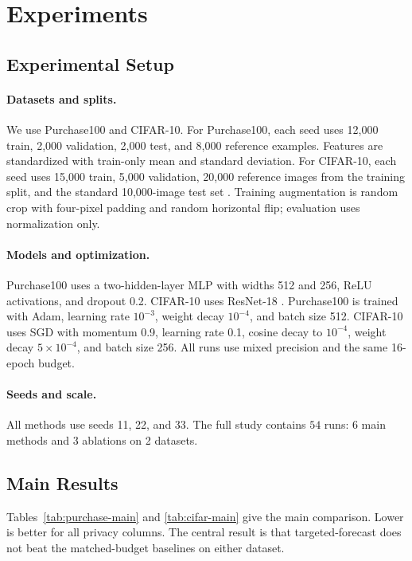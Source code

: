 \documentclass{article}
\newcommand{\purch}{Purchase100}
\newcommand{\cifar}{CIFAR-10}
\begin{document}
\section{Experiments}
\label{sec:experiments}

\subsection{Experimental Setup}

\paragraph{Datasets and splits.}
We use \purch{} and \cifar{}.
For \purch{}, each seed uses 12{,}000 train, 2{,}000 validation, 2{,}000 test, and 8{,}000 reference examples. Features are standardized with train-only mean and standard deviation.
For \cifar{}, each seed uses 15{,}000 train, 5{,}000 validation, 20{,}000 reference images from the training split, and the standard 10{,}000-image test set \citep{cifar10}. Training augmentation is random crop with four-pixel padding and random horizontal flip; evaluation uses normalization only.

\paragraph{Models and optimization.}
\purch{} uses a two-hidden-layer MLP with widths 512 and 256, ReLU activations, and dropout 0.2. \cifar{} uses ResNet-18 \citep{he2016resnet}. \purch{} is trained with Adam, learning rate $10^{-3}$, weight decay $10^{-4}$, and batch size 512. \cifar{} uses SGD with momentum 0.9, learning rate 0.1, cosine decay to $10^{-4}$, weight decay $5\times 10^{-4}$, and batch size 256. All runs use mixed precision and the same 16-epoch budget.

\paragraph{Seeds and scale.}
All methods use seeds 11, 22, and 33. The full study contains $54$ runs: 6 main methods and 3 ablations on 2 datasets.

\subsection{Main Results}

Tables~\ref{tab:purchase-main} and \ref{tab:cifar-main} give the main comparison. Lower is better for all privacy columns. The central result is that targeted-forecast does not beat the matched-budget baselines on either dataset.
\end{document}

